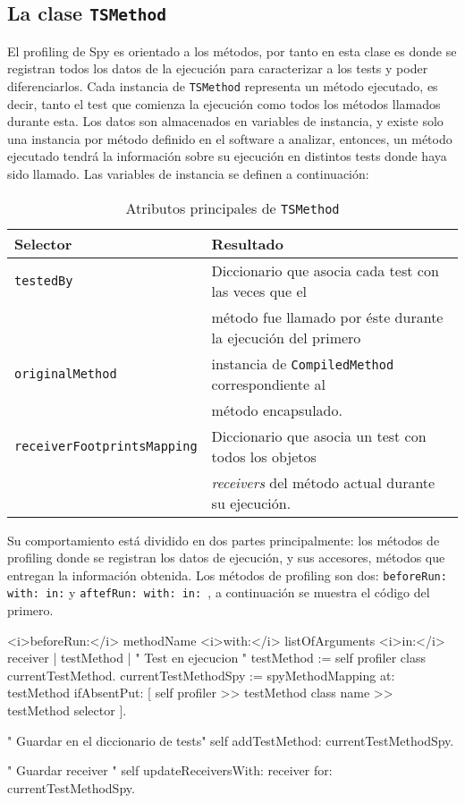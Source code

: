 \subsection{La clase {\tt TSMethod} }
\par El profiling de Spy es orientado a los métodos, por tanto en esta clase es donde se registran todos los datos de la ejecución para caracterizar a los tests y poder diferenciarlos. Cada instancia de {\tt TSMethod} representa un método ejecutado, es decir, tanto el test que comienza la ejecución como todos los métodos llamados durante esta. Los datos son almacenados en variables de instancia, y existe solo una instancia por método definido en el software a analizar, entonces, un método ejecutado tendrá la información sobre su ejecución en distintos tests donde haya sido llamado. Las variables de instancia se definen a continuación:

\begin{table}[h] 
    \centering 
    \begin{tabular}{|l|l|}
    	\hline
\textbf{Selector} & \textbf{Resultado} \\ \hline \hline
{\tt testedBy}	& Diccionario que asocia cada test con las veces que el \\
				& método fue llamado por éste durante la ejecución del primero\\ \hline
{\tt originalMethod} & instancia de {\tt CompiledMethod} correspondiente al  \\
						& método encapsulado. \\ \hline
{\tt receiverFootprintsMapping} & Diccionario que asocia un test con todos los objetos \\
						& \emph{receivers} del método actual durante su ejecución. \\ \hline
    \end{tabular}
    \caption{Atributos principales de {\tt TSMethod}}
\end{table} 

\par Su comportamiento está dividido en dos partes principalmente: los métodos de profiling donde se registran los datos de ejecución, y sus accesores, métodos que entregan la información obtenida. Los métodos de profiling son dos: {\tt beforeRun: with: in:} y {\tt aftefRun: with: in: }, a continuación se muestra el código del primero. 

\begin{codeWithLineNumbers}
<i>beforeRun:</i> methodName <i>with:</i> listOfArguments <i>in:</i> receiver
	| testMethod |
	" Test en ejecucion "
	testMethod := self profiler class currentTestMethod.
	currentTestMethodSpy := 
			spyMethodMapping at: testMethod ifAbsentPut: 
				[ self profiler >> testMethod class name >> testMethod selector ].
		
	" Guardar en el diccionario de tests"	
	self addTestMethod: currentTestMethodSpy.

	" Guardar receiver "
	self updateReceiversWith: receiver for: currentTestMethodSpy.

\end{codeWithLineNumbers}

